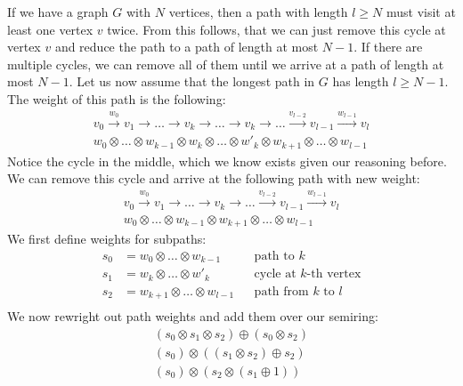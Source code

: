 \documentclass[a4paper,12pt]{ETHexercise}
\begin{document}
\begin{question}
\begin{subquestion}
	\end{subquestion}
	\begin{subquestion}If we have a graph $G$ with $N$ vertices, then a path with length $l \geq N$ must visit at least one vertex $v$ twice. From this follows, that we can just remove this cycle at vertex $v$ and reduce the path to a path of length at most $N - 1$. If there are multiple cycles, we can remove all of them until we arrive at a path of length at most $N - 1$. Let us now assume that the longest path in $G$ has length $l \geq N-1$. The weight of this path is the following:
		\begin{align}
			v_{0} \overset{w_0}{\rightarrow} v_1 \rightarrow \dots \rightarrow v_{k} \rightarrow \dots \rightarrow v_{k} \rightarrow \dots \overset{v_{l-2}}{\rightarrow} v_{l-1} \overset{w_{l-1}}{\rightarrow} v_l \\
			w_0 \otimes \dots \otimes w_{k-1} \otimes w_{k} \otimes \dots \otimes w'_{k} \otimes w_{k+1} \otimes \dots \otimes w_{l-1}
		\end{align}
		Notice the cycle in the middle, which we know exists given our reasoning before. We can remove this cycle and arrive at the following path with new weight:
		\begin{align}
			v_{0} \overset{w_0}{\rightarrow} v_1 \rightarrow \dots \rightarrow v_{k} \rightarrow \dots \overset{v_{l-2}}{\rightarrow} v_{l-1} \overset{w_{l-1}}{\rightarrow} v_l \\
			w_0 \otimes \dots \otimes w_{k-1} \otimes w_{k+1} \otimes \dots \otimes w_{l-1}
		\end{align}
		We first define weights for subpaths:
		\begin{align}
			s_0 & = w_0 \otimes \dots \otimes w_{k-1}     &  & \text{path to $k$}            \\
			s_1 & = w_{k} \otimes \dots \otimes w'_{k}    &  & \text{cycle at $k$-th vertex} \\
			s_2 & = w_{k+1} \otimes \dots \otimes w_{l-1} &  & \text{path from $k$ to $l$}   \\
		\end{align}
		We now rewright out path weights and add them over our semiring:
		\begin{align}
			\left( s_0 \otimes s_1 \otimes s_2 \right) \oplus \left( s_0 \otimes s_2 \right)                       \\
			\left( s_0 \right) \otimes \left( \left( s_1 \otimes s_2 \right) \oplus s_2 \right)                    \\
			\left( s_0 \right) \otimes \left( s_2 \otimes \left( s_1 \oplus 1 \right) \right)                      \\

\end{align}
\end{subquestion}
\end{question}
\end{document}
